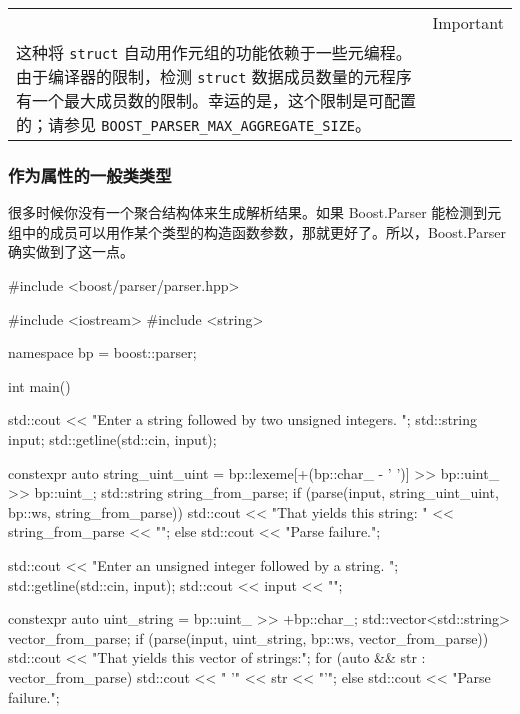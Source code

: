 \begin{longtable}[]{@{}
  >{\raggedright\arraybackslash}p{}
  >{\raggedright\arraybackslash}p{}@{}}
\toprule\noalign{}
\endhead
\bottomrule\noalign{}
\endlastfoot
\begin{minipage}[t]{\linewidth}\raggedright
\end{minipage} & Important \\
这种将 \texttt{struct} 自动用作元组的功能依赖于一些元编程。由于编译器的限制，检测 \texttt{struct} 数据成员数量的元程序有一个最大成员数的限制。幸运的是，这个限制是可配置的；请参见 \texttt{BOOST\_PARSER\_MAX\_AGGREGATE\_SIZE}。 & \\
\end{longtable}

\subsubsection{作为属性的一般类类型}

很多时候你没有一个聚合结构体来生成解析结果。如果 Boost.Parser 能检测到元组中的成员可以用作某个类型的构造函数参数，那就更好了。所以，Boost.Parser 确实做到了这一点。

\begin{code}
#include <boost/parser/parser.hpp>

#include <iostream>
#include <string>


namespace bp = boost::parser;

int main()
{
    std::cout << "Enter a string followed by two unsigned integers. ";
    std::string input;
    std::getline(std::cin, input);

    constexpr auto string_uint_uint =
        bp::lexeme[+(bp::char_ - ' ')] >> bp::uint_ >> bp::uint_;
    std::string string_from_parse;
    if (parse(input, string_uint_uint, bp::ws, string_from_parse))
        std::cout << "That yields this string: " << string_from_parse << "\n";
    else
        std::cout << "Parse failure.\n";

    std::cout << "Enter an unsigned integer followed by a string. ";
    std::getline(std::cin, input);
    std::cout << input << "\n";

    constexpr auto uint_string = bp::uint_ >> +bp::char_;
    std::vector<std::string> vector_from_parse;
    if (parse(input, uint_string, bp::ws, vector_from_parse)) {
        std::cout << "That yields this vector of strings:\n";
        for (auto && str : vector_from_parse) {
            std::cout << "  '" << str << "'\n";
        }
    } else {
        std::cout << "Parse failure.\n";
    }
}
\end{code}

